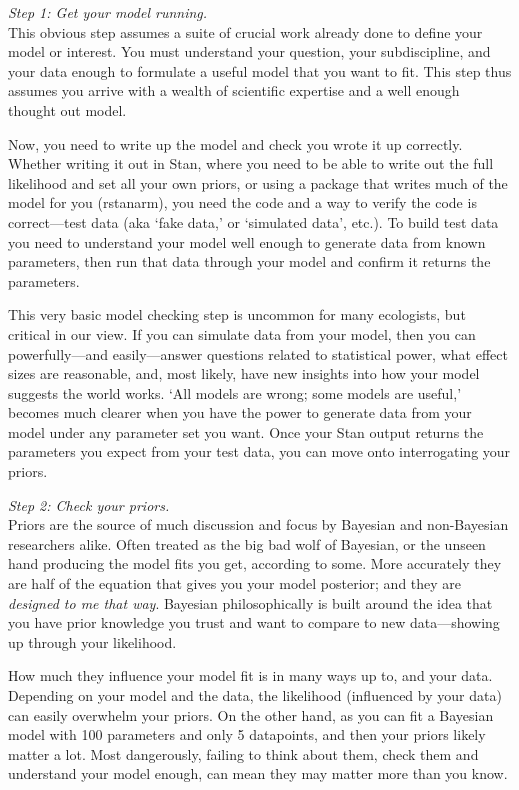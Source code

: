\documentclass[11pt]{article}
\begin{document}
\emph{Step 1: Get your model running.} \\
This obvious step assumes a suite of crucial work already done to define your model or interest. You must understand your question, your subdiscipline, and your data enough to formulate a useful model that you want to fit. This step thus assumes you arrive with a wealth of scientific expertise and a well enough thought out model. 

Now, you need to write up the model and check you wrote it up correctly. Whether writing it out in \textsf{Stan}, where you need to be able to write out the full likelihood and set all your own priors, or using a package that writes much of the model for you (\eg \textsf{rstanarm}), you need the code and a way to verify the code is correct---test data (aka `fake data,' or `simulated data', etc.). To build test data you need to understand your model well enough to generate data from known parameters, then run that data through your model and confirm it returns the parameters. 

This very basic model checking step is uncommon for many ecologists, but critical in our view. If you can simulate data from your model, then you can powerfully---and easily---answer questions related to statistical power, what effect sizes are reasonable, and, most likely, have new insights into how your model suggests the world works. `All models are wrong; some models are useful,' becomes much clearer when you have the power to generate data from your model under any parameter set you want. Once your \textsf{Stan} output returns the parameters you expect from your test data, you can move onto interrogating your priors. 

\emph{Step 2: Check your priors.} \\
Priors are the source of much discussion and focus by Bayesian and non-Bayesian researchers alike. Often treated as the big bad wolf of Bayesian, or the unseen hand producing the model fits you get, according to some. More accurately they are half of the equation that gives you your model posterior; and they are \emph{designed to me that way}. Bayesian philosophically is built around the idea that you have prior knowledge you trust and want to compare to new data---showing up through your likelihood.

How much they influence your model fit is in many ways up to, and your data. Depending on your model and the data, the likelihood (influenced by your data) can easily overwhelm your priors.  On the other hand, as you can fit a Bayesian model with 100 parameters and only 5 datapoints, and then your priors likely matter a lot. Most dangerously, failing to think about them, check them and understand your model enough, can mean they may matter more than you know. 
\end{document}
